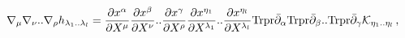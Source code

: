 \begin{equation}
\nabla_{\mu}\nabla_{\nu}..\nabla_{\rho}h_{\lambda_{1}..\lambda_{l}}=
\frac{\partial x^\alpha}{\partial X^\mu} \frac{\partial x^\beta}
{\partial X^\nu}..\frac{\partial x^\gamma}{\partial X^\rho}
\frac{\partial x^{\eta_{1}}}{\partial X^{\lambda_{1}}}
..\frac{\partial x^{\eta_{l}}} {\partial X^{\lambda_{l}}}
\mbox{Trpr}\bar{\partial}_{\alpha}\mbox{Trpr}\bar{\partial}_{\beta}
..\mbox{Trpr}\bar{\partial}_{\gamma}{\cal
K}_{\eta_{1}..\eta_{l}}\,,
\end{equation}

